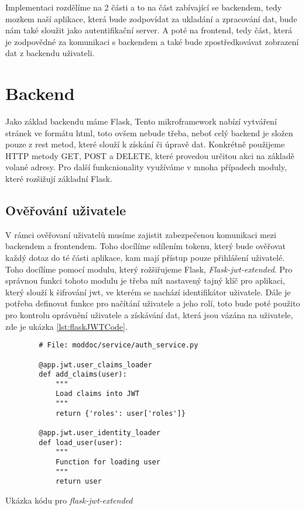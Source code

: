 Implementaci rozdělíme na 2 části a to na část zabívající se backendem, tedy mozkem naší aplikace, která bude zodpovídat
za ukladání a zpracování dat, bude nám také sloužit jako autentifikační server. A poté na frontend, tedy část, která
je zodpovědné za komunikaci s backendem a také bude zpostředkovávat zobrazení dat z backendu uživateli.

\section{Backend}

Jako základ backendu máme Flask,  \cite{flaskDoc}
Tento mikroframework nabízí vytváření stránek ve formátu \gls{html}, toto ovšem nebude třeba, neboť celý backend je složen pouze z rest metod,
které slouží k získání či úpravě dat. Konkrétně použijeme HTTP metody GET, POST a DELETE, které provedou určitou akci na základě volané adresy.
Pro další funkcnionality využíváme v mnoha případech moduly, které rozšižují základní Flask.

\subsection{Ověřování uživatele}

V rámci ověřovaní uživatelů musíme zajistit zabezpečenou komunikaci mezi backendem a frontendem. Toho docílíme sdílením tokenu, který bude ověřovat
každý dotaz do té části aplikace, kam mají přístup pouze přihlášení uživatelé. Toho docílíme pomocí modulu, který rožšiřujeme Flask,
\textit{Flask-jwt-extended}. Pro správnou funkci tohoto modulu je třeba mít nastavený tajný klíč pro aplikaci, který slouží k šifrování \gls{jwt},
ve kterém se nachází identifikátor uživatele. Dále je potřeba definovat funkce pro načítání uživatele a jeho rolí, toto bude poté použito pro kontrolu
oprávnění uživatele a získávání dat, která jsou vázána na uživatele, zde je ukázka \ref{lst:flaskJWTCode}.

\begin{listing}
    \begin{verbatim}
        # File: moddoc/service/auth_service.py

        @app.jwt.user_claims_loader
        def add_claims(user):
            """
            Load claims into JWT
            """
            return {'roles': user['roles']}

        @app.jwt.user_identity_loader
        def load_user(user):
            """
            Function for loading user
            """
            return user
    \end{verbatim}
    \caption{Ukázka kódu pro \textit{flask-jwt-extended}}
    \label{lst:flaskJWTCode}
\end{listing}

